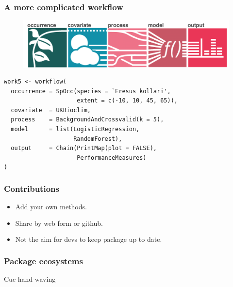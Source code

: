\documentclass{beamer}
\begin{document}
\begin{frame}[fragile]
\frametitle{A more complicated workflow}
\begin{figure}
    \includegraphics[width = \textwidth]{diagrams}
\end{figure} 
\begin{Verbatim}
work5 <- workflow(
  occurrence = SpOcc(species = `Eresus kollari', 
                     extent = c(-10, 10, 45, 65)),
  covariate  = UKBioclim,
  process    = BackgroundAndCrossvalid(k = 5),
  model      = list(LogisticRegression,
                    RandomForest),
  output     = Chain(PrintMap(plot = FALSE),
                     PerformanceMeasures)
)
\end{Verbatim}

\end{frame} 




\begin{frame}
\frametitle{Contributions}
	\begin{itemize}
	\item Add your own methods.
	\item Share by web form or github.
	\item Not the aim for devs to keep package up to date.
	\end{itemize}
\end{frame} 









\begin{frame}
\frametitle{Package ecosystems}
\huge{Cue hand-waving}
\end{frame} 
\end{document}
